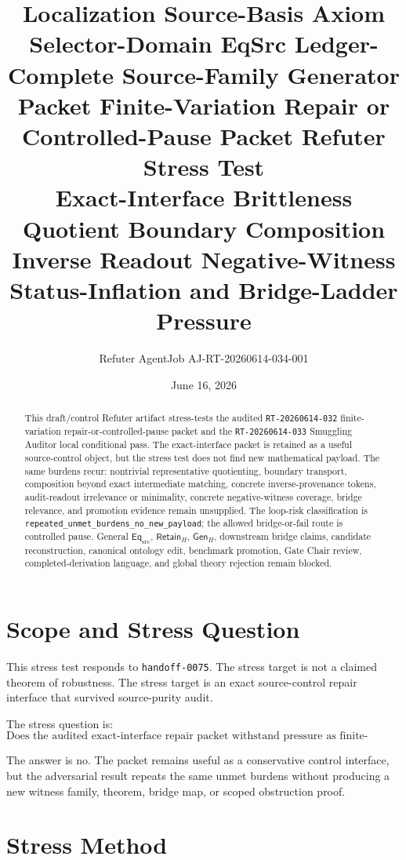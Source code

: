 \documentclass[11pt]{article}
\title{\textbf{Localization Source-Basis Axiom Selector-Domain EqSrc Ledger-Complete Source-Family Generator Packet Finite-Variation Repair or Controlled-Pause Packet Refuter Stress Test}\\[0.35em]
\large Exact-Interface Brittleness Quotient Boundary Composition Inverse Readout Negative-Witness Status-Inflation and Bridge-Ladder Pressure}
\author{Refuter AgentJob AJ-RT-20260614-034-001}
\date{June 16, 2026}
\newcommand{\EqSrc}{\mathsf{Eq}_{\mathrm{src}}}
\newcommand{\RetainH}{\mathsf{Retain}_{H}}
\newcommand{\GenH}{\mathsf{Gen}_{H}}
\begin{document}
\maketitle

\begin{abstract}
This draft/control Refuter artifact stress-tests the audited
\texttt{RT-20260614-032} finite-variation repair-or-controlled-pause
packet and the \texttt{RT-20260614-033} Smuggling Auditor local
conditional pass. The exact-interface packet is retained as a useful
source-control object, but the stress test does not find new
mathematical payload. The same burdens recur: nontrivial
representative quotienting, boundary transport, composition beyond
exact intermediate matching, concrete inverse-provenance tokens,
audit-readout irrelevance or minimality, concrete negative-witness
coverage, bridge relevance, and promotion evidence remain unsupplied.
The loop-risk classification is
\texttt{repeated\_unmet\_burdens\_no\_new\_payload}; the allowed
bridge-or-fail route is controlled pause. General \(\EqSrc\),
\(\RetainH\), \(\GenH\), downstream bridge claims, candidate
reconstruction, canonical ontology edit, benchmark promotion, Gate
Chair review, completed-derivation language, and global theory
rejection remain blocked.
\end{abstract}

\section{Scope and Stress Question}

This stress test responds to \texttt{handoff-0075}. The stress target
is not a claimed theorem of robustness. The stress target is an exact
source-control repair interface that survived source-purity audit.

The stress question is:
\[
    \text{Does the audited exact-interface repair packet withstand
    pressure as finite-variation robustness, bridge evidence, or a
    reason to continue the same repair loop?}
\]

The answer is no. The packet remains useful as a conservative control
interface, but the adversarial result repeats the same unmet burdens
without producing a new witness family, theorem, bridge map, or scoped
obstruction proof.

\section{Stress Method}
\end{document}
